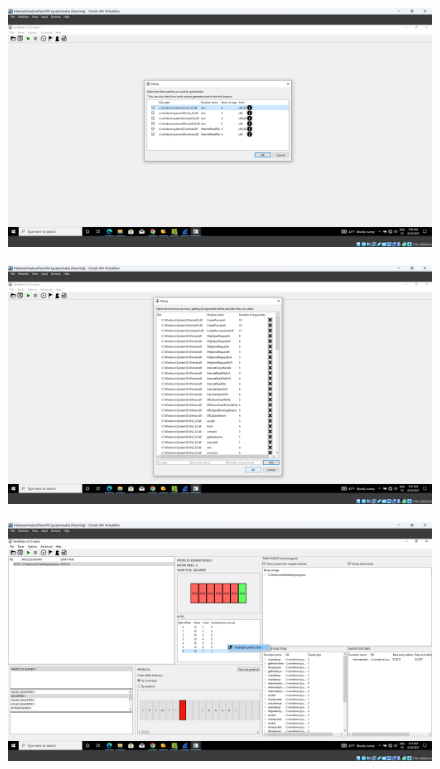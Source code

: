 \documentclass[conference]{IEEEtran}
\begin{document}
\begin{figure}
    \centerline{\includegraphics[width=\textwidth]{images/sch_s2.png}}
    \caption{}
    \label{figure:ap_sch_s2}
\end{figure}

\begin{figure}
    \centerline{\includegraphics[width=\textwidth]{images/sch_s3.png}}
    \caption{}
    \label{figure:ap_sch_s3}
\end{figure}

\begin{figure}
    \centerline{\includegraphics[width=\textwidth]{images/sch_s5.png}}
    \caption{}
    \label{figure:ap_sch_s5}
\end{figure}
\end{document}
